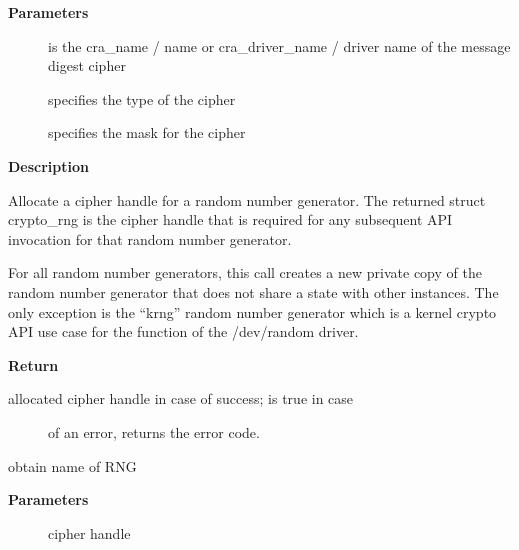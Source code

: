 \documentclass[a4paper,8pt,english]{sphinxmanual}
\begin{document}
\textbf{Parameters}
\begin{description}
\item[{}] \leavevmode
is the cra\_name / name or cra\_driver\_name / driver name of the
message digest cipher

\item[{}] \leavevmode
specifies the type of the cipher

\item[{}] \leavevmode
specifies the mask for the cipher

\end{description}

\textbf{Description}

Allocate a cipher handle for a random number generator. The returned struct
crypto\_rng is the cipher handle that is required for any subsequent
API invocation for that random number generator.

For all random number generators, this call creates a new private copy of
the random number generator that does not share a state with other
instances. The only exception is the ``krng'' random number generator which
is a kernel crypto API use case for the  function of the
/dev/random driver.

\textbf{Return}
\begin{description}
\item[{allocated cipher handle in case of success;  is true in case}] \leavevmode
of an error,  returns the error code.

\end{description}

\begin{fulllineitems}
\label{crypto/api-rng:c.crypto_rng_alg}
obtain name of RNG

\end{fulllineitems}


\textbf{Parameters}
\begin{description}
\item[{}] \leavevmode
cipher handle

\end{description}
\end{document}
